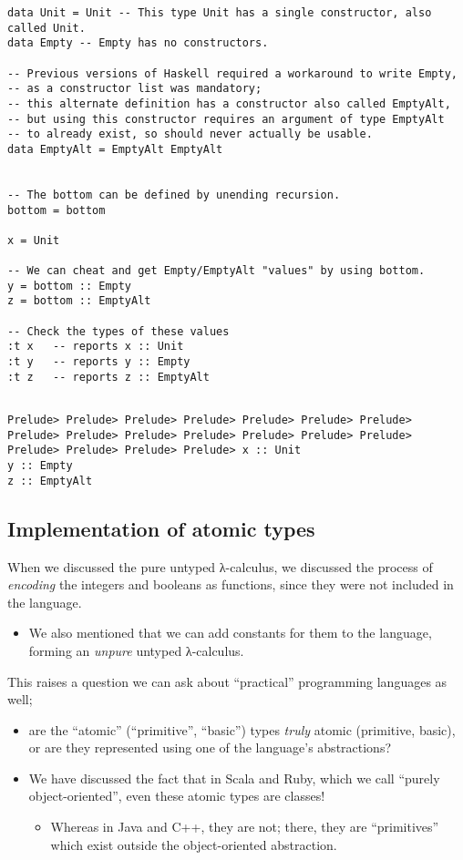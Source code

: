 \documentclass[11pt]{article}
\theoremstyle{definition}
\begin{document}
\begin{verbatim}
data Unit = Unit -- This type Unit has a single constructor, also called Unit.
data Empty -- Empty has no constructors.

-- Previous versions of Haskell required a workaround to write Empty,
-- as a constructor list was mandatory;
-- this alternate definition has a constructor also called EmptyAlt,
-- but using this constructor requires an argument of type EmptyAlt
-- to already exist, so should never actually be usable.
data EmptyAlt = EmptyAlt EmptyAlt


-- The bottom can be defined by unending recursion.
bottom = bottom
  
x = Unit

-- We can cheat and get Empty/EmptyAlt "values" by using bottom.
y = bottom :: Empty
z = bottom :: EmptyAlt

-- Check the types of these values
:t x   -- reports x :: Unit
:t y   -- reports y :: Empty
:t z   -- reports z :: EmptyAlt
\end{verbatim}


\begin{verbatim}

Prelude> Prelude> Prelude> Prelude> Prelude> Prelude> Prelude> Prelude> Prelude> Prelude> Prelude> Prelude> Prelude> Prelude> Prelude> Prelude> Prelude> Prelude> x :: Unit
y :: Empty
z :: EmptyAlt
\end{verbatim}

\subsection{Implementation of atomic types}
\label{sec:orga1e673c}

When we discussed the pure untyped λ-calculus,
we discussed the process of \emph{encoding} the integers and booleans
as functions, since they were not included in the language.
\begin{itemize}
\item We also mentioned that we can add constants for them
to the language, forming an \emph{unpure} untyped λ-calculus.
\end{itemize}

This raises a question we can ask about
“practical” programming languages as well;
\begin{itemize}
\item are the “atomic” (“primitive”, “basic”) types \emph{truly} atomic
(primitive, basic), or are they represented
using one of the language's abstractions?
\item We have discussed the fact that in Scala and Ruby, which we call
“purely object-oriented”, even these atomic types are classes!
\begin{itemize}
\item Whereas in Java and C++, they are not;
there, they are “primitives” which exist
outside the object-oriented abstraction.
\end{itemize}
\end{itemize}
\end{document}
